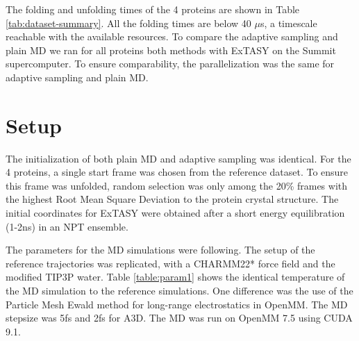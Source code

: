 \begin{table}[H]
\centering
\caption{Proteins for the comparison of adaptive sampling and plain MD. }\label{table:dataset-summary}
\end{table}
The folding and unfolding times of the 4 proteins are shown in Table \ref{tab:dataset-summary}. All the folding times are below 40 $\mu$s, a timescale reachable with the available resources. To compare the adaptive sampling and plain MD we ran for all proteins both methods with ExTASY on the Summit supercomputer. To ensure comparability, the parallelization was the same for adaptive sampling and plain MD.


\section{\label{sec:MD}Setup}

The initialization of both plain MD and adaptive sampling was identical. For the 4 proteins, a single start frame was chosen from the reference dataset. To ensure this frame was unfolded, random selection was only among the 20\% frames with the highest Root Mean Square Deviation to the
protein crystal structure. The initial coordinates for ExTASY were obtained after a short energy equilibration (1-2ns) in an NPT ensemble. 

The parameters for the MD simulations were following. The setup of the reference trajectories \cite{lindorff2011} was replicated, with a CHARMM22* force field \cite{Charmm22star}
and the modified TIP3P water. Table \ref{table:param1} shows the identical temperature of the MD simulation to the reference simulations. One difference was the use of the Particle Mesh Ewald method for long-range electrostatics in OpenMM. The MD stepsize was 5fs and 2fs for A3D. The MD was run on OpenMM 7.5 \cite{openMM} using CUDA 9.1.  

